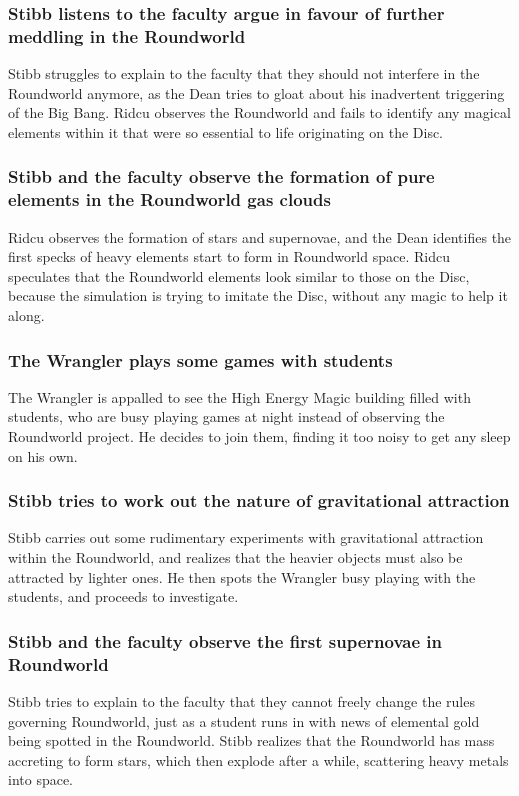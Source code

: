\subsubsection{\Gls{Stibb} listens to the faculty argue in favour of further meddling in the
    Roundworld}
\Gls{Stibb} struggles to explain to the faculty that they should not interfere in the Roundworld
anymore, as the \Gls{Dean} tries to gloat about his inadvertent triggering of the Big Bang.
\Gls{Ridcu} observes the Roundworld and fails to identify any magical elements within it that were
so essential to life originating on the Disc.

\subsubsection{\Gls{Stibb} and the faculty observe the formation of pure elements in the Roundworld
    gas clouds}
\Gls{Ridcu} observes the formation of stars and supernovae, and the \Gls{Dean} identifies the first
specks of heavy elements start to form in Roundworld space. \Gls{Ridcu} speculates that the
Roundworld elements look similar to those on the Disc, because the simulation is trying to imitate
the Disc, without any magic to help it along.

\subsubsection{The \Gls{Wrangler} plays some games with students}
The \Gls{Wrangler} is appalled to see the High Energy Magic building filled with students, who
are busy playing games at night instead of observing the Roundworld project. He decides to join
them, finding it too noisy to get any sleep on his own.

\subsubsection{\Gls{Stibb} tries to work out the nature of gravitational attraction}
\Gls{Stibb} carries out some rudimentary experiments with gravitational attraction within the
Roundworld, and realizes that the heavier objects must also be attracted by lighter ones. He then
spots the \Gls{Wrangler} busy playing with the students, and proceeds to investigate.

\subsubsection{\Gls{Stibb} and the faculty observe the first supernovae in Roundworld}
\Gls{Stibb} tries to explain to the faculty that they cannot freely change the rules governing
Roundworld, just as a student runs in with news of elemental gold being spotted in the Roundworld.
\Gls{Stibb} realizes that the Roundworld has mass accreting to form stars, which then explode after
a while, scattering heavy metals into space.

